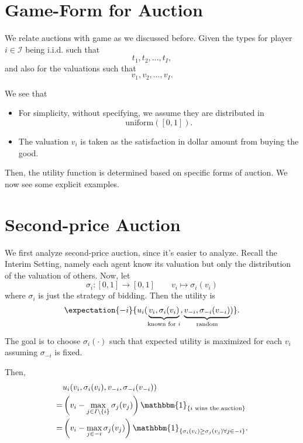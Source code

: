\section{Game-Form for Auction}
We relate auctions with game as we discussed before. Given the types for player \(i\in \mathcal{I} \) being i.i.d. such that
\[
	t_1, t_2, \ldots , t_I,
\]
and also for the valuations such that
\[
	v_1, v_2, \ldots , v_I.
\]

\begin{note}
	We see that
	\begin{itemize}
		\item For simplicity, without specifying, we assume they are distributed in
		      \[
			      \mathrm{uniform} ([0, 1]).
		      \]
		\item The valuation \(v_{i}\) is taken as the satisfaction in dollar amount from buying the good.
	\end{itemize}
\end{note}

Then, the utility function is determined based on specific forms of auction. We now see some explicit examples.

\section{Second-price Auction}
We first analyze second-price auction, since it's easier to analyze. Recall the Interim Setting, namely each agent know its valuation but
only the distribution of the valuation of others. Now, let
\[
	\sigma_{i}\colon [0, 1]\to [0, 1]\qquad v_{i}\mapsto  \sigma_{i}(v_{i})
\]
where \(\sigma_{i}\) is just the strategy of bidding. Then the utility is
\[
	\expectation{-i}{u_{i}(\underbrace{v_{i}, \sigma_{i}(v_{i})}_{\text{known for \(i\)}}, \underbrace{v_{-i}, \sigma_{-i}(v_{-i})}_{\text{random}})}.
\]

The goal is to choose \(\sigma_{i}(\cdot)\) such that expected utility is maximized for each \(v_{i}\)
assuming \(\sigma_{-i}\) is fixed.

Then,
\[
	\begin{split}
		&u_{i}(v_{i}, \sigma_{i}(v_{i}), v_{-i}, \sigma_{-i}(v_{-i}))\\
		=&\left(v_{i} - \max_{j\in I\setminus\{i\}}\sigma_{j}(v_{j})\right)\mathbbm{1}_{\{\text{\(i\) wins the auction}\}}\\
		=&\left(v_{i} - \max_{j\in -i}\sigma_{j}(v_{j})\right)\mathbbm{1}_{\{ \sigma_{i}(v_{i})\geq \sigma_{j}(v_{j}) \forall j\in -i \}}.
	\end{split}
\]

